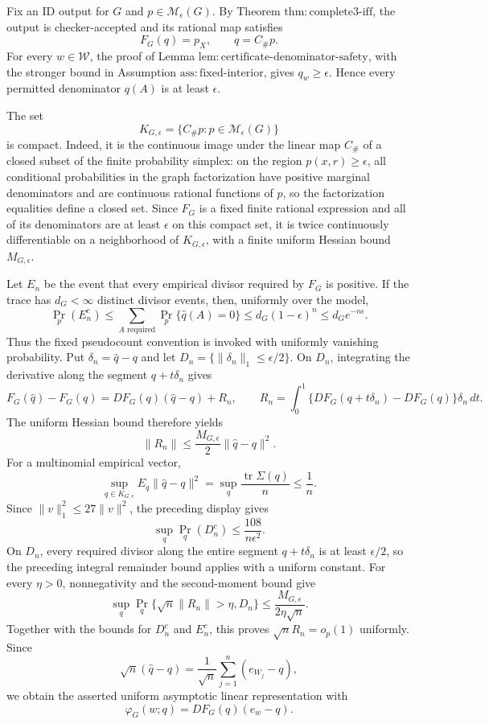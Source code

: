 Fix an \(\mathrm{ID}\) output for \(G\) and \(p\in\mathcal M_\epsilon(G)\).  By Theorem \(\mathrm{thm{:}complete3\text{-}iff}\), the output is checker-accepted and its rational map satisfies
\[
F_G(q)=p_X,\qquad q=C_{\#}p.
\]
For every \(w\in\mathcal W\), the proof of Lemma \(\mathrm{lem{:}certificate\text{-}denominator\text{-}safety}\), with the stronger bound in Assumption \(\mathrm{ass{:}fixed\text{-}interior}\), gives \(q_w\ge\epsilon\).  Hence every permitted denominator \(q(A)\) is at least \(\epsilon\).

The set
\[
K_{G,\epsilon}=\{C_{\#}p:p\in\mathcal M_\epsilon(G)\}
\]
is compact.  Indeed, it is the continuous image under the linear map \(C_{\#}\) of a closed subset of the finite probability simplex: on the region \(p(x,r)\ge\epsilon\), all conditional probabilities in the graph factorization have positive marginal denominators and are continuous rational functions of \(p\), so the factorization equalities define a closed set.  Since \(F_G\) is a fixed finite rational expression and all of its denominators are at least \(\epsilon\) on this compact set, it is twice continuously differentiable on a neighborhood of \(K_{G,\epsilon}\), with a finite uniform Hessian bound \(M_{G,\epsilon}\).

Let \(E_n\) be the event that every empirical divisor required by \(F_G\) is positive.  If the trace has \(d_G<\infty\) distinct divisor events, then, uniformly over the model,
\[
\Pr_p(E_n^c)
\le\sum_{A\text{ required}}\Pr_p\{\widehat q(A)=0\}
\le d_G(1-\epsilon)^n
\le d_Ge^{-n\epsilon}.
\]
Thus the fixed pseudocount convention is invoked with uniformly vanishing probability.  Put \(\delta_n=\widehat q-q\) and let \(D_n=\{\|\delta_n\|_1\le\epsilon/2\}\).  On \(D_n\), integrating the derivative along the segment \(q+t\delta_n\) gives
\[
F_G(\widehat q)-F_G(q)
=D F_G(q)(\widehat q-q)+R_n,
\qquad
R_n=\int_0^1\{D F_G(q+t\delta_n)-D F_G(q)\}\delta_n\,dt.
\]
The uniform Hessian bound therefore yields
\[
\|R_n\|\le \frac{M_{G,\epsilon}}2\|\widehat q-q\|^2.
\]
For a multinomial empirical vector,
\[
\sup_{q\in K_{G,\epsilon}}E_q\|\widehat q-q\|^2
=\sup_q\frac{\operatorname{tr}\Sigma(q)}{n}
\le\frac1n.
\]
Since \(\|v\|_1^2\le27\|v\|^2\), the preceding display gives
\[
\sup_q\Pr_q(D_n^c)\le\frac{108}{n\epsilon^2}.
\]
On \(D_n\), every required divisor along the entire segment \(q+t\delta_n\) is at least \(\epsilon/2\), so the preceding integral remainder bound applies with a uniform constant.  For every \(\eta>0\), nonnegativity and the second-moment bound give
\[
\sup_q\Pr_q\{\sqrt n\|R_n\|>\eta,D_n\}
\le\frac{M_{G,\epsilon}}{2\eta\sqrt n}.
\]
Together with the bounds for \(D_n^c\) and \(E_n^c\), this proves \(\sqrt nR_n=o_p(1)\) uniformly.  Since
\[
\sqrt n(\widehat q-q)=\frac1{\sqrt n}\sum_{j=1}^n(e_{W_j}-q),
\]
we obtain the asserted uniform asymptotic linear representation with
\[
\varphi_G(w;q)=D F_G(q)(e_w-q).
\]

